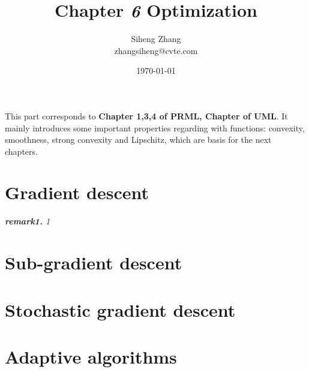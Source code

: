 \documentclass{article}
\author{Siheng Zhang\\zhangsiheng@cvte.com}
\title{Chapter \textbf{\textit{6}} Optimization}
\date{\today}
\begin{document}
\maketitle  

This part corresponds to \textbf{Chapter 1,3,4 of PRML, Chapter of UML}. It mainly introduces some important properties regarding with functions: convexity, smoothness, strong convexity and Lipschitz, which are basis for the next chapters.

\tableofcontents
\newpage

\section{Gradient descent}

	\begin{framed}
	\begin{scriptsize}
	\begin{spacing}{1.2}
	\noindent\textit{\textbf{remark1.} 1}
	\end{spacing}
	\end{scriptsize}
	\end{framed}

\section{Sub-gradient descent}
\section{Stochastic gradient descent}
\section{Adaptive algorithms}
\end{document}
